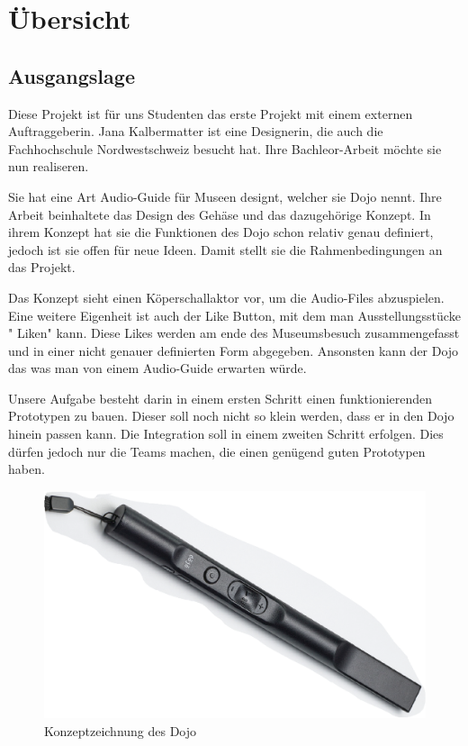 \section{Übersicht} 

\subsection{Ausgangslage}
Diese Projekt ist für uns Studenten das erste Projekt mit einem externen Auftraggeberin. Jana Kalbermatter ist eine Designerin, die auch die Fachhochschule Nordwestschweiz besucht hat. Ihre Bachleor-Arbeit möchte sie nun realiseren.

Sie hat eine Art Audio-Guide für Museen designt, welcher sie Dojo nennt. Ihre Arbeit beinhaltete das Design des Gehäse und das dazugehörige Konzept. In ihrem Konzept hat sie die Funktionen des Dojo schon relativ genau definiert, jedoch ist sie offen für neue Ideen. Damit stellt sie die Rahmenbedingungen an das Projekt.

Das Konzept sieht einen Köperschallaktor vor, um die Audio-Files abzuspielen. Eine weitere Eigenheit ist auch der Like Button, mit dem man Ausstellungsstücke " Liken" kann. Diese Likes werden am ende des Museumsbesuch zusammengefasst und in einer nicht genauer definierten Form abgegeben. Ansonsten kann der Dojo das was man von einem Audio-Guide erwarten würde.

Unsere Aufgabe besteht darin in einem ersten Schritt einen funktionierenden Prototypen zu bauen. Dieser soll noch nicht so klein werden, dass er in den Dojo hinein passen kann. Die Integration soll in einem zweiten Schritt erfolgen. Dies dürfen jedoch nur die Teams machen, die einen genügend guten Prototypen haben.

\begin{figure}[H]
\begin{center}
	\includegraphics[width=160mm]{data/Ausgangslage_Dojo.png}
	\caption{Konzeptzeichnung des Dojo} %
	\label{fig:first_layer}
\end{center}
\end{figure}

